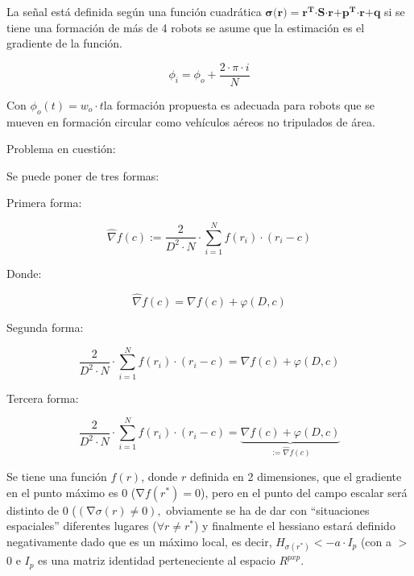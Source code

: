 \noindent La señal está definida según una función cuadrática $\boldsymbol{\sigma }\boldsymbol{(}\boldsymbol{r}\boldsymbol{)=}{\boldsymbol{r}}^{\boldsymbol{T}}\boldsymbol{\cdot}\boldsymbol{S}\boldsymbol{\cdot}\boldsymbol{r}\boldsymbol{+}{\boldsymbol{p}}^{\boldsymbol{T}}\boldsymbol{\cdot}\boldsymbol{r}\boldsymbol{+}\boldsymbol{q}$ si se tiene una formación de más de 4 robots se asume que la estimación es el gradiente de la función.

\noindent 
\[{\phi }_i={\phi }_{o}+\frac{2\cdot\pi \cdot{i}}{N} \] 

Con ${\phi }_{o}\left(t\right)=w_{o}\cdot{t}$la formación propuesta es adecuada para robots que se mueven en formación circular como vehículos aéreos no tripulados de área.

Problema en cuestión:

Se puede poner de tres formas:

Primera forma:

\begin{equation*}
	\hat{\nabla}{f}\left(c\right):=\frac{2}{{D}^2\cdot{N}}\cdot\sum_{i=1}^{N}f(r_{i})\cdot(r_{i}-c)
\end{equation*}

Donde:

\begin{equation*}
	\hat{\nabla}{f}\left(c\right) = \nabla{f}\left(c\right) + \varphi\left(D,c\right)
\end{equation*}

Segunda forma:

\begin{equation*}
	\frac{2}{{D}^2\cdot{N}}\cdot\sum_{i=1}^{N}f(r_{i})\cdot(r_{i}-c)=\nabla{f}\left(c\right) + \varphi\left(D,c\right)
\end{equation*}


Tercera forma:

\begin{equation*}
	\frac{2}{{D}^2\cdot{N}}\cdot\sum_{i=1}^{N}f(r_{i})\cdot(r_{i}-c)=\underbrace{\nabla{f}\left(c\right) + \varphi\left(D,c\right)}_{:=\hat{\nabla}{f}\left(c\right)}
\end{equation*}


Se tiene una función $f\left(r\right)$, donde $r$ definida en 2 dimensiones, que el gradiente en el punto máximo es 0 ($\mathrm{\nabla }f\left(r^*\right)=0$), pero en el punto del campo escalar será distinto de 0 ($\left(\mathrm{\nabla }\sigma \left(r\right)\neq 0\right),$ obviamente se ha de dar con ``situaciones espaciales'' diferentes lugares ($\forall r\neq r^*$) y finalmente el hessiano estará definido negativamente dado que es un máximo local, es decir, $H_{\sigma (r^*)}<-a\cdot{I}_{p}$ (con a $\mathrm{>}$ 0 e $I_p$ es una matriz identidad perteneciente al espacio $R^{pxp}$.



